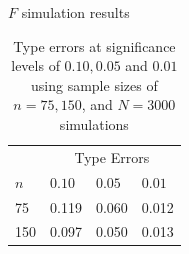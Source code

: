 \documentclass[9pt,notes=hide]{beamer}
\begin{document}
\begin{frame}{$F$ simulation results}
	\begin{table}[H]
		\centering
		\caption{Type  errors at significance levels of $0.10, 0.05$ and $0.01$ using  sample sizes of $n = 75, 150$, and $N = 3000$ simulations}
		\begin{tabular}{@{}l|lll@{}}
			\toprule
			{}  & \multicolumn{3}{c}{Type \rom{1} Errors}                   \\
			$n$ & $0.10$                                  & $0.05$ & $0.01$ \\
			\midrule
			75  & 0.119                                   & 0.060  & 0.012  \\
			150 & 0.097                                   & 0.050  & 0.013  \\
			\bottomrule
		\end{tabular}
	\end{table}
\end{frame}
\end{document}
